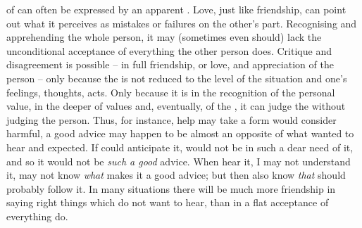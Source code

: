 \pa {} of  can often be expressed by an apparent
.  Love, just like friendship, can point out what it perceives as
mistakes or failures on the other's part.  Recognising and apprehending the
whole person, it may (sometimes even should) lack the unconditional acceptance
of everything the other person does. Critique and disagreement is possible -- in
full friendship, or love, and appreciation of the person -- only because the
 is not reduced to the level of the  situation and
one's feelings, thoughts, acts.  Only because it is  in the
recognition of the personal value, in the deeper  of values and,
eventually, of the , it can judge the  without judging the
person.  Thus, for instance, help may take a form  would consider harmful,
a good advice may happen to be almost an opposite of what  wanted to hear
and expected. If  could anticipate it,  would not be in such a dear
need of it, and so it would not be {\em such a good} advice. When  hear
it, I may not understand it,  may not know {\em what} makes it a good
advice; but then  also know {\em that}  should probably follow it.
In many situations %
there will be much more friendship in saying right things which  do not
want to hear, than in a flat acceptance of everything  do.

